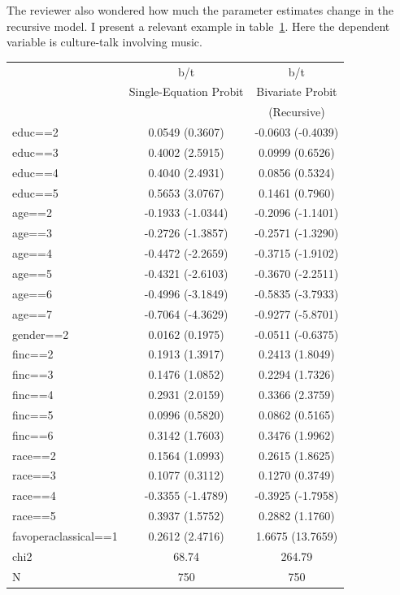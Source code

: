 \documentclass[11pt]{article}
\begin{document}
The reviewer also wondered how much the parameter estimates change in the recursive model.   I present a relevant example in table~\ref{tab2}. Here the dependent variable is culture-talk involving music.  

\begin{table}[here]
\begin{tabular}{l*{2}{c}}
\hline
                &      b/t&      b/t\\
				&   Single-Equation Probit & Bivariate Probit\\
				&   & (Recursive) \\
educ==2         &0.0549 (0.3607)&-0.0603 (-0.4039)\\
educ==3         &0.4002 (2.5915)&0.0999 (0.6526)\\
educ==4         &0.4040 (2.4931)&0.0856 (0.5324)\\
educ==5         &0.5653 (3.0767)&0.1461 (0.7960)\\
age==2          &-0.1933 (-1.0344)&-0.2096 (-1.1401)\\
age==3          &-0.2726 (-1.3857)&-0.2571 (-1.3290)\\
age==4          &-0.4472 (-2.2659)&-0.3715 (-1.9102)\\
age==5          &-0.4321 (-2.6103)&-0.3670 (-2.2511)\\
age==6          &-0.4996 (-3.1849)&-0.5835 (-3.7933)\\
age==7          &-0.7064 (-4.3629)&-0.9277 (-5.8701)\\
gender==2       &0.0162 (0.1975)&-0.0511 (-0.6375)\\
finc==2         &0.1913 (1.3917)&0.2413 (1.8049)\\
finc==3         &0.1476 (1.0852)&0.2294 (1.7326)\\
finc==4         &0.2931 (2.0159)&0.3366 (2.3759)\\
finc==5         &0.0996 (0.5820)&0.0862 (0.5165)\\
finc==6         &0.3142 (1.7603)&0.3476 (1.9962)\\
race==2         &0.1564 (1.0993)&0.2615 (1.8625)\\
race==3         &0.1077 (0.3112)&0.1270 (0.3749)\\
race==4         &-0.3355 (-1.4789)&-0.3925 (-1.7958)\\
race==5         &0.3937 (1.5752)&0.2882 (1.1760)\\
favoperaclassical==1&0.2612 (2.4716)&1.6675 (13.7659)\\
chi2            &    68.74&   264.79\\
N               &      750&      750\\
\hline
\end{tabular}
\label{tab2}
\end{table}
\end{document}
